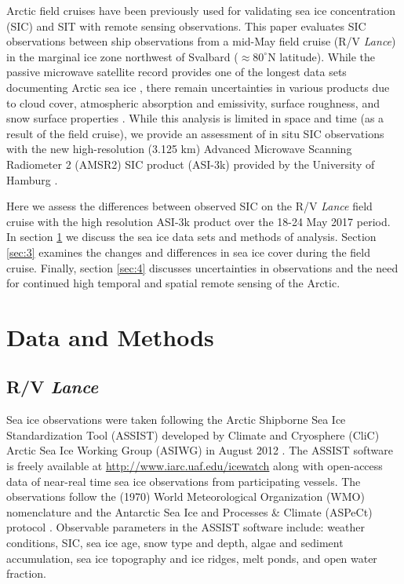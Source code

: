 \documentclass[draft,linenumbers]{agujournal}
\begin{document}
Arctic field cruises have been previously used for validating sea ice concentration (SIC) \citep[e.g.,][]{Spreen2008} and SIT \citep[e.g.,][]{Kaleschke2016} with remote sensing observations. This paper evaluates SIC observations between ship observations from a mid-May field cruise (R/V \textit{Lance}) in the marginal ice zone northwest of Svalbard ($\approx 80^{\circ}$N latitude). While the passive microwave satellite record provides one of the longest data sets documenting Arctic sea ice \citep{Parkinson1999a}, there remain uncertainties in various products due to cloud cover, atmospheric absorption and emissivity, surface roughness, and snow surface properties \citep{Rayner2003a, Andersen2007}. While this analysis is limited in space and time (as a result of the field cruise), we provide an assessment of in situ SIC observations with the new high-resolution (3.125 km) Advanced Microwave Scanning Radiometer 2 (AMSR2) SIC product (ASI-3k) provided by the University of Hamburg \citep{Beitsch2014}.

Here we assess the differences between observed SIC on the R/V \textit{Lance} field cruise with the high resolution ASI-3k product over the 18-24 May 2017 period. In section \ref{sec:2} we discuss the sea ice data sets and methods of analysis. Section \ref{sec:3} examines the changes and differences in sea ice cover during the field cruise. Finally, section \ref{sec:4} discusses uncertainties in observations and the need for continued high temporal and spatial remote sensing of the Arctic.


\section{Data and Methods}
\label{sec:2}
\subsection{R/V \textit{Lance}}
\label{sec:2.1}
Sea ice observations were taken following the Arctic Shipborne Sea Ice Standardization Tool (ASSIST) developed by Climate and Cryosphere (CliC) Arctic Sea Ice Working Group (ASIWG) in August 2012 \citep{Orlich2013}. The ASSIST software is freely available at \url{http://www.iarc.uaf.edu/icewatch} along with open-access data of near-real time sea ice observations from participating vessels. The observations follow the (1970) World Meteorological Organization (WMO) nomenclature and the Antarctic Sea Ice and Processes \& Climate (ASPeCt) protocol \citep{Orlich2013}. Observable parameters in the ASSIST software include: weather conditions, SIC, sea ice age, snow type and depth, algae and sediment accumulation, sea ice topography and ice ridges, melt ponds, and open water fraction. 
\end{document}
